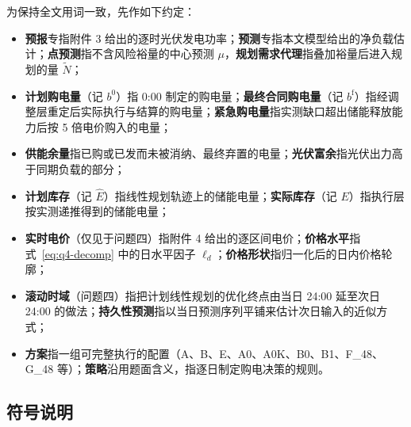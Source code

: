 为保持全文用词一致，先作如下约定：

\begin{itemize}
  \item \textbf{预报}专指附件 3 给出的逐时光伏发电功率；\textbf{预测}专指本文模型给出的净负载估计；\textbf{点预测}指不含风险裕量的中心预测 $\mu$，\textbf{规划需求代理}指叠加裕量后进入规划的量 $\widetilde N$；
  \item \textbf{计划购电量}（记 $b^{0}$）指 0:00 制定的购电量；\textbf{最终合同购电量}（记 $b^{\mathrm f}$）指经调整层重定后实际执行与结算的购电量；\textbf{紧急购电量}指实测缺口超出储能释放能力后按 5 倍电价购入的电量；
  \item \textbf{供能余量}指已购或已发而未被消纳、最终弃置的电量；\textbf{光伏富余}指光伏出力高于同期负载的部分；
  \item \textbf{计划库存}（记 $\widehat E$）指线性规划轨迹上的储能电量；\textbf{实际库存}（记 $E$）指执行层按实测递推得到的储能电量；
  \item \textbf{实时电价}（仅见于问题四）指附件 4 给出的逐区间电价；\textbf{价格水平}指式~\eqref{eq:q4-decomp} 中的日水平因子 $\ell_d$；\textbf{价格形状}指归一化后的日内价格轮廓；
  \item \textbf{滚动时域}（问题四）指把计划线性规划的优化终点由当日 24:00 延至次日 24:00 的做法；\textbf{持久性预测}指以当日预测序列平铺来估计次日输入的近似方式；
  \item \textbf{方案}指一组可完整执行的配置（A、B、E、A0、A0K、B0、B1、F\_48、G\_48 等）；\textbf{策略}沿用题面含义，指逐日制定购电决策的规则。
\end{itemize}

\subsection{符号说明}

